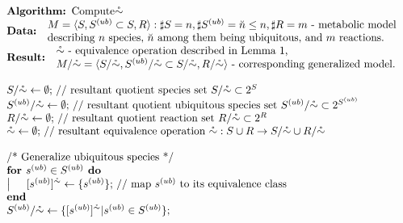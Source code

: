 \documentclass[9pt]{article}
\begin{document}
\[ \begin{array}{l}
\mbox{\textbf{Algorithm: }Compute$\mathring{\sim}$}\\
\mbox{\textbf{Data: }} \begin{array}{l} \mbox{$M=\langle{S, S^{(ub)}\subset{S}, R}\rangle: \sharp S = n, \sharp S^{(ub)}=\breve{n} \leq n, \sharp R = m$ - metabolic model}\\ \mbox{describing $n$ species,  $\breve{n}$ among them being ubiquitous,  and $m$ reactions.} 
\end{array}\\
\mbox{\textbf{Result: }} \begin{array}{l} \mbox{$\mathring{\sim}$ - equivalence operation described in Lemma~1,}\\  \mbox{$M/{\mathring{\sim}} = \langle S/{\mathring{\sim}}, S^{(ub)}/{\mathring{\sim}} \subset S/{\mathring{\sim}}, R/{\mathring{\sim}} \rangle$ - corresponding generalized model.} \end{array}\\
\mbox{~}\\
\mbox{$S/{\mathring{\sim}} \leftarrow \emptyset;$ // resultant quotient species set $ S/{\mathring{\sim}}\subset 2^S$}\\
\mbox{$S^{(ub)}/{\mathring{\sim}} \leftarrow \emptyset;$ // resultant quotient ubiquitous species set $ S^{(ub)}/{\mathring{\sim}}\subset 2^{S^{(ub)}}$}\\
\mbox{$R/{\mathring{\sim}} \leftarrow \emptyset;$ // resultant quotient reaction set $ R/{\mathring{\sim}}\subset 2^R$}\\
\mbox{$\mathring{\sim} \leftarrow \emptyset;$ // resultant equivalence operation $ {\mathring{\sim}}: S\cup{R} \rightarrow S/{\mathring{\sim}}\cup{R/{\mathring{\sim}}}$}\\
\mbox{~}\\
\mbox{/* Generalize ubiquitous species */}\\
\mbox{\textbf{for }$s^{(ub)} \in S^{(ub)}$\textbf{ do}}\\
\left| \indent\mbox{$[s^{(ub)}]^{\mathring{\sim}} \leftarrow \{s^{(ub)}\};$ // map $s^{(ub)}$ to its equivalence class}\right. \\
\mbox{\textbf{end}}\\
\mbox{$S^{(ub)}/{\mathring{\sim}} \leftarrow \{[s^{(ub)}]^{\mathring{\sim}}|s^{(ub)} \in S^{(ub)}\};$}\\

\end{array}\]
\end{document}
